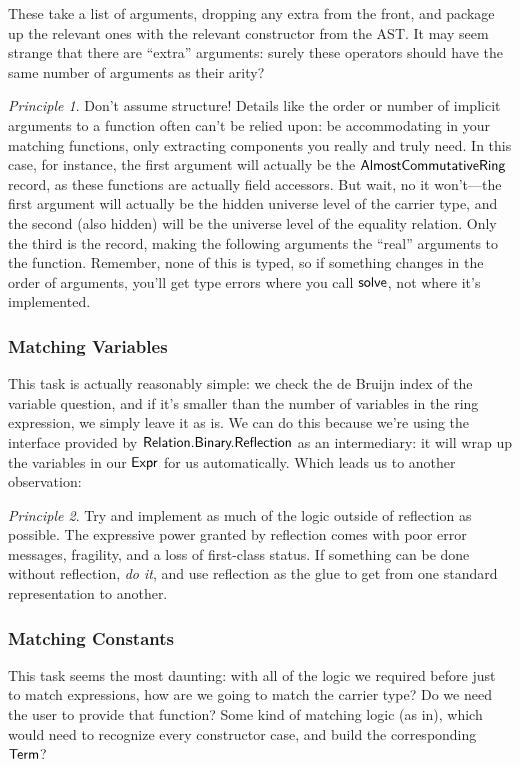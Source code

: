 \documentclass[draft, twocolumn]{article}
\theoremstyle{definition}
\theoremstyle{remark}
\newtheorem{principle}{Principle}[section]
\begin{document}
These take a list of arguments, dropping any extra from the front, and package
up the relevant ones with the relevant constructor from the AST. It may seem
strange that there are ``extra'' arguments: surely these operators should have
the same number of arguments as their arity?

\begin{principle}{Don't assume structure!}
  Details like the order or number of implicit arguments to a function often
  can't be relied upon: be accommodating in your matching functions, only
  extracting components you really and truly need. In this case, for instance,
  the first argument will actually be the
  \(\AgdaDatatype{AlmostCommutativeRing}\) record, as these functions are
  actually field accessors. But wait, no it won't---the first argument will
  actually be the hidden universe level of the carrier type, and the second
  (also hidden) will be the universe level of the equality relation. Only the
  third is the record, making the following arguments the ``real'' arguments to
  the function. Remember, none of this is typed, so if something changes in the
  order of arguments, you'll get type errors where you call
  \(\AgdaMacro{solve}\), not where it's implemented.
\end{principle}
\subsubsection{Matching Variables}
This task is actually reasonably simple: we check the de Bruijn index of the
variable question, and if it's smaller than the number of variables in the ring
expression, we simply leave it as is. We can do this because we're using the
interface provided by \(\AgdaModule{Relation.Binary.Reflection}\) as an
intermediary: it will wrap up the variables in our \(\AgdaDatatype{Expr}\) for
us automatically. Which leads us to another observation:
\begin{principle}{Try and implement as much of the logic outside of reflection
    as possible.}
  The expressive power granted by reflection comes with poor error messages,
  fragility, and a loss of first-class status. If something can be done without
  reflection, \emph{do it}, and use reflection as the glue to get from one
  standard representation to another.
\end{principle}
\subsubsection{Matching Constants}
This task seems the most daunting: with all of the logic we required before just
to match expressions, how are we going to match the carrier type? Do we need the
user to provide that function? Some kind of matching logic (as
in\cite{jedynak_simple_2018}), which would need to recognize every constructor
case, and build the corresponding \(\AgdaDatatype{Term}\)?
\end{document}
